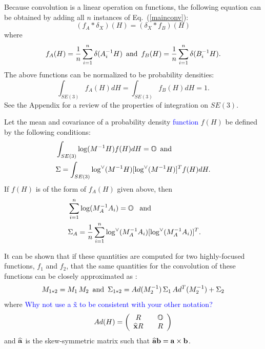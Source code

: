 \documentclass[twocolumn,10pt]{asme2ej}
\begin{document}
Because convolution is a linear operation on functions, the following equation can be obtained by adding all $n$ instances of Eq.~(\ref{mainconv}):
\begin{equation} (f_A * \delta_X)(H) = (\delta_X * f_B)(H) \label{mainconvall} \end{equation}
where $$ f_A(H) = \frac{1}{n} \sum_{i=1}^{n} \delta(A_i^{-1} H) \,\,\, {\rm and} \,\,\, f_B(H) = \frac{1}{n} \sum_{i=1}^{n} \delta(B_i^{-1} H). $$
The above functions can be normalized
to be probability densities:
$$ \int_{SE(3)} f_A(H) dH = \int_{SE(3)} f_B(H) dH = 1. $$
See the Appendix for a review of the properties of integration on $SE(3)$.

Let the mean and covariance of a probability density \textcolor{blue}{function} $f(H)$ be defined by the following conditions:
\begin{equation} \begin{split} &\int_{SE(3)} \log(M^{-1} H) f(H) dH = \mathbb{O} \,\,\, {\rm and} \,\,\,\\ &\Sigma = \int_{SE(3)} \log^{\vee}(M^{-1} H) [\log^{\vee}(M^{-1} H)]^T  f(H) dH . \end{split}\label{meancovdef} \end{equation}
If $f(H)$ is of the form of $f_A(H)$ given above, then
\begin{equation} \
\begin{split} &\sum_{i=1}^{n} \log(M_A^{-1} A_i) = \mathbb{O} {\rm \,\,\,\,\, and} \\
&\Sigma_A = \frac{1}{n} \sum_{i=1}^{n} \log^{\vee}(M_A^{-1} A_i) [\log^{\vee}(M_A^{-1} A_i)]^T.  \label{datameancovconvdef} \end{split}
\end{equation}

It can be shown that if these quantities are computed for two highly-focused functions, $f_1$ and $f_2$, that the same quantities for
the convolution of these functions can be closely approximated as \cite{Wang08}:
\begin{equation}
M_{1*2} = M_1 \, M_2 \,\,\, {\rm and} \,\,\, \Sigma_{1*2} = Ad(M_2^{-1}) \,\Sigma_{1}\, Ad^T(M_2^{-1}) + \Sigma_{2}
\label{meancovconvdef} \end{equation}
where \textcolor{blue}{Why not use a \~x to be consistent with your other notation?}
\begin{equation} 
Ad(H) = \left(\begin{array}{ccc}
R && \mathbb{O} \\
\widehat{{\bf x}} R && R \end{array}\right) 
\label{adjdef} \end{equation}
and $\widehat{{\bf a}}$ is the skew-symmetric matrix such that $\widehat{{\bf a}} {\bf b} = {\bf a} \times {\bf b}$.
\end{document}
